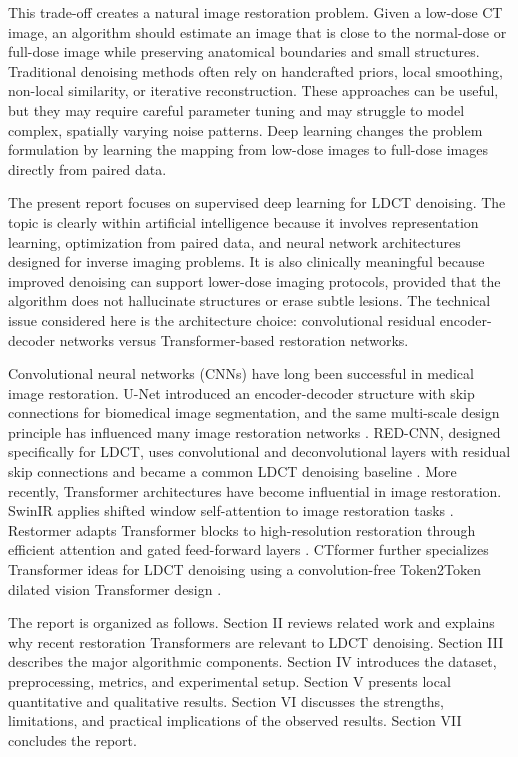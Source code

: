 \documentclass[journal]{IEEEtran}
\begin{document}
This trade-off creates a natural image restoration problem. Given a low-dose CT image, an algorithm should estimate an image that is close to the normal-dose or full-dose image while preserving anatomical boundaries and small structures. Traditional denoising methods often rely on handcrafted priors, local smoothing, non-local similarity, or iterative reconstruction. These approaches can be useful, but they may require careful parameter tuning and may struggle to model complex, spatially varying noise patterns. Deep learning changes the problem formulation by learning the mapping from low-dose images to full-dose images directly from paired data.

The present report focuses on supervised deep learning for LDCT denoising. The topic is clearly within artificial intelligence because it involves representation learning, optimization from paired data, and neural network architectures designed for inverse imaging problems. It is also clinically meaningful because improved denoising can support lower-dose imaging protocols, provided that the algorithm does not hallucinate structures or erase subtle lesions. The technical issue considered here is the architecture choice: convolutional residual encoder-decoder networks versus Transformer-based restoration networks.

Convolutional neural networks (CNNs) have long been successful in medical image restoration. U-Net introduced an encoder-decoder structure with skip connections for biomedical image segmentation, and the same multi-scale design principle has influenced many image restoration networks \cite{ronneberger2015unet}. RED-CNN, designed specifically for LDCT, uses convolutional and deconvolutional layers with residual skip connections and became a common LDCT denoising baseline \cite{chen2017redcnn}. More recently, Transformer architectures have become influential in image restoration. SwinIR applies shifted window self-attention to image restoration tasks \cite{liang2021swinir}. Restormer adapts Transformer blocks to high-resolution restoration through efficient attention and gated feed-forward layers \cite{zamir2022restormer}. CTformer further specializes Transformer ideas for LDCT denoising using a convolution-free Token2Token dilated vision Transformer design \cite{wang2023ctformer}.

The report is organized as follows. Section II reviews related work and explains why recent restoration Transformers are relevant to LDCT denoising. Section III describes the major algorithmic components. Section IV introduces the dataset, preprocessing, metrics, and experimental setup. Section V presents local quantitative and qualitative results. Section VI discusses the strengths, limitations, and practical implications of the observed results. Section VII concludes the report.
\end{document}
